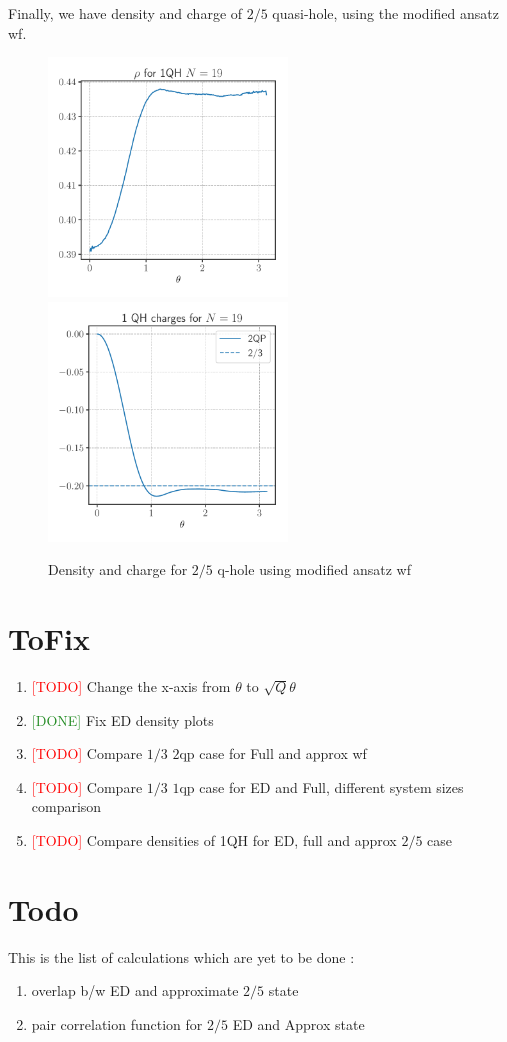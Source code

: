 \documentclass[11pt,a4paper,notitlepage]{article}
\newcommand{\txtgr}[1]{\textcolor{ForestGreen}{#1}}
\newcommand{\txtre}[1]{\textcolor{Red}{#1}}
\newcommand{\todo}{\txtre{[TODO] }}
\newcommand{\done}{\txtgr{[DONE] }}
\begin{document}
	\pagebreak
	Finally, we have density and charge of $2/5$ quasi-hole, using the modified ansatz wf. 
	
	\begin{figure}[h]
		\centering
		\includegraphics[width=2.5in]{figures/1qh_density_2b5_N19_ansatz.pdf}
		\includegraphics[width=2.5in]{figures/qh_charges_1b3_ansatz.pdf}
		\caption{Density and charge for $2/5$ q-hole using modified ansatz wf}
	\end{figure}
	
	\section{ToFix}
	
	\begin{enumerate}
		\item \todo Change the x-axis from $\theta$ to $\sqrt{Q}\theta$
		\item \done Fix ED density plots 
		\item \todo Compare $1/3$ $2$qp case for Full and approx wf 
		\item \todo Compare $1/3$ $1$qp case for ED and Full, different system sizes comparison
		\item \todo Compare densities of 1QH for ED, full and approx $2/5$ case
	\end{enumerate}
	
	\section{Todo}
	
	This is the list of calculations which are yet to be done :
	
	\begin{enumerate}
		\item overlap b/w ED and approximate $2/5$ state \\
		\item pair correlation function for $2/5$ ED and Approx state
	\end{enumerate}
	
	
\end{document}
